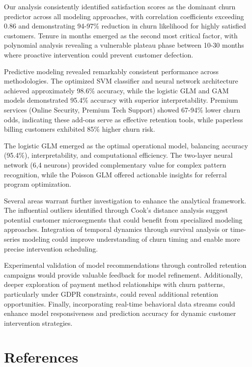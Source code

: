\documentclass[
]{article}
\begin{document}
Our analysis consistently identified satisfaction scores as the dominant
churn predictor across all modeling approaches, with correlation
coefficients exceeding 0.86 and demonstrating 94-97\% reduction in churn
likelihood for highly satisfied customers. Tenure in months emerged as
the second most critical factor, with polynomial analysis revealing a
vulnerable plateau phase between 10-30 months where proactive
intervention could prevent customer defection.

Predictive modeling revealed remarkably consistent performance across
methodologies. The optimized SVM classifier and neural network
architecture achieved approximately 98.6\% accuracy, while the logistic
GLM and GAM models demonstrated 95.4\% accuracy with superior
interpretability. Premium services (Online Security, Premium Tech
Support) showed 67-94\% lower churn odds, indicating these add-ons serve
as effective retention tools, while paperless billing customers
exhibited 85\% higher churn risk.

The logistic GLM emerged as the optimal operational model, balancing
accuracy (95.4\%), interpretability, and computational efficiency. The
two-layer neural network (6,4 neurons) provided complementary value for
complex pattern recognition, while the Poisson GLM offered actionable
insights for referral program optimization.

Several areas warrant further investigation to enhance the analytical
framework. The influential outliers identified through Cook's distance
analysis suggest potential customer microsegments that could benefit
from specialized modeling approaches. Integration of temporal dynamics
through survival analysis or time-series modeling could improve
understanding of churn timing and enable more precise intervention
scheduling.

Experimental validation of model recommendations through controlled
retention campaigns would provide valuable feedback for model
refinement. Additionally, deeper exploration of payment method
relationships with churn patterns, particularly under GDPR constraints,
could reveal additional retention opportunities. Finally, incorporating
real-time behavioral data streams could enhance model responsiveness and
prediction accuracy for dynamic customer intervention strategies.

\hypertarget{references}{%
\section*{References}\label{references}}
\end{document}

